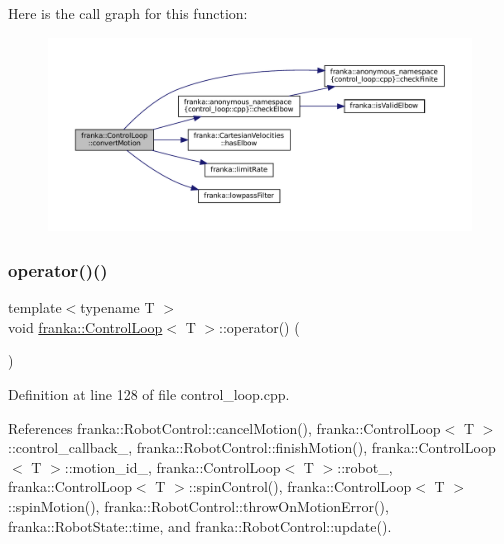 Here is the call graph for this function\+:
\nopagebreak
\begin{figure}[H]
\begin{center}
\leavevmode
\includegraphics[width=350pt]{classfranka_1_1ControlLoop_ae6c2b0808a95542fa41e2351f7d8f242_cgraph}
\end{center}
\end{figure}
\mbox{\label{classfranka_1_1ControlLoop_acfd08b5dca8a6618b2c4f8aa0ce751b7}} 
\subsubsection{\texorpdfstring{operator()()}{operator()()}}
{\footnotesize\ttfamily template$<$typename T $>$ \\
void \hyperlink{classfranka_1_1ControlLoop}{franka\+::\+Control\+Loop}$<$ T $>$\+::operator() (\begin{DoxyParamCaption}{ }\end{DoxyParamCaption})}



Definition at line 128 of file control\+\_\+loop.\+cpp.



References franka\+::\+Robot\+Control\+::cancel\+Motion(), franka\+::\+Control\+Loop$<$ T $>$\+::control\+\_\+callback\+\_\+, franka\+::\+Robot\+Control\+::finish\+Motion(), franka\+::\+Control\+Loop$<$ T $>$\+::motion\+\_\+id\+\_\+, franka\+::\+Control\+Loop$<$ T $>$\+::robot\+\_\+, franka\+::\+Control\+Loop$<$ T $>$\+::spin\+Control(), franka\+::\+Control\+Loop$<$ T $>$\+::spin\+Motion(), franka\+::\+Robot\+Control\+::throw\+On\+Motion\+Error(), franka\+::\+Robot\+State\+::time, and franka\+::\+Robot\+Control\+::update().



